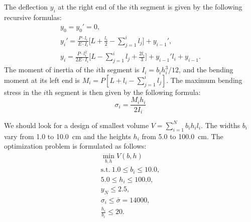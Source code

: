 \documentclass[runningheads,a4paper]{llncs}
\begin{document}
The deflection $y_i$ at the right end of the $i$th segment is given by the
following recursive formulas:
\begin{displaymath}
  \begin{array}{c}
    y_0=y_0'=0, \\
    y_i'=\frac{P\cdot l_i}{E\cdot I_i}\Big[ L+\frac{l_i}{2}-\sum\limits_{j=1}^i l_j\Big]+y_{i-1}', \\
    y_i=\frac{P\cdot l_i^2}{2E\cdot I_i}\Big[L-\sum\limits_{j=1}^i l_j + \frac{2l_i}{3}\Big]+y_{i-1}'l_i+y_{i-1}.
  \end{array}
\end{displaymath}
The moment of inertia of the $i$th segment is $I_i={b_i h_i^3}/{12}$, and the
bending moment at its left end is $M_i=P[L+l_i- \sum_{j=1}^{i}  l_j ]$. The
maximum bending stress in the $i$th segment is then given by the following
formula:
\begin{displaymath}
  \sigma_i=\frac{M_i h_i}{2I_i}
\end{displaymath}

We should look for a design of smallest volume $V = \sum_{i=1}^N b_i h_i l_i$.
The widths $b_i$ vary from 1.0 to 10.0~cm and the heights $h_i$ from 5.0 to
100.0~cm. The optimization problem is formulated as follows:
\begin{displaymath}
  \begin{array}{c}
    \min\limits_{ b,  h}V( b,  h) \\
    \text{s.t.}\ 1.0\le b_i \le 10.0, \\
    5.0 \le h_i \le 100.0, \\
    y_N\le 2.5, \\
    \sigma_i \le \bar{\sigma}=14000, \\
    \frac{h_i}{b_i}\le 20.
  \end{array}
\end{displaymath}
\end{document}
